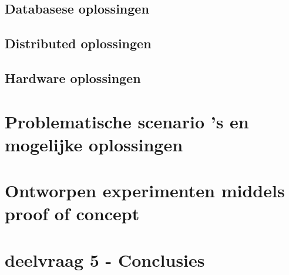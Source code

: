 
\subsection{Databasese oplossingen}

\clearpage

\subsection{Distributed oplossingen}

\clearpage

\subsection{Hardware oplossingen}

\clearpage

\section{Problematische scenario 's en mogelijke oplossingen}
\label{sec:deelvraag3}

\clearpage


\section{Ontworpen experimenten middels proof of concept}
\label{sec:deelvraag4}

\clearpage

\section{deelvraag 5 - Conclusies}
\label{sec:deelvraag5}
